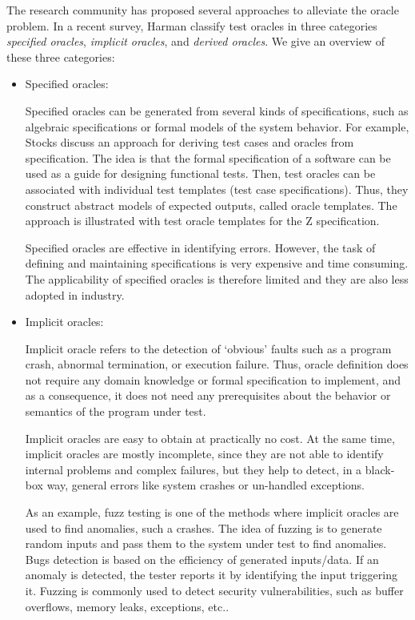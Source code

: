 The research community has proposed several approaches\cite{harman2013comprehensive,barr2015oracle} to alleviate the oracle problem. 
In a recent survey, Harman \etal\cite{harman2013comprehensive} classify test oracles in three categories \textit{specified oracles}, \textit{implicit oracles}, and \textit{derived oracles}. We give an overview of these three categories:
\begin{itemize}
	\item Specified oracles:
	
	Specified oracles can be generated from several kinds of specifications, such as algebraic specifications or formal models of the system behavior. 
	For example, Stocks \etal\cite{stocks1996framework,richardson1992specification} discuss an approach for deriving test cases and oracles from specification. The idea is that the formal specification of a software can be used as a guide for designing functional tests. Then, test oracles can be associated with individual test templates (test case specifications). Thus, they construct abstract models of expected outputs, called oracle templates. 
	The approach is illustrated with test oracle templates for the Z specification.
	
	Specified oracles are effective in identifying errors. However, the task of defining and maintaining specifications is very expensive and time consuming. The applicability of specified oracles is therefore limited and they are also less adopted in industry.
	
	\item Implicit oracles:
	
	Implicit oracle refers to the detection of ‘obvious’ faults such as a program crash, abnormal termination, or execution failure.
	Thus, oracle definition does not require any domain knowledge or formal specification to implement, and as a consequence, it does not need any prerequisites about the behavior or semantics of the program under test.
	
	Implicit oracles\cite{harman2013comprehensive,barr2015oracle} are easy to obtain at practically no cost. At the same time, implicit oracles are mostly incomplete, since they are not able to identify internal problems and complex failures, but they help to detect, in a black-box way, general errors like system crashes or un-handled exceptions.
	
	As an example, fuzz testing\cite{miller1990empirical} is one of the methods where implicit oracles are used to find anomalies, such a crashes. The idea of fuzzing is to generate random inputs and pass them to the system under test to find anomalies.
	Bugs detection is based on the efficiency of generated inputs/data. If an anomaly is detected, the tester reports it by identifying the input triggering it. 
	Fuzzing is commonly used to detect security vulnerabilities, such as buffer overflows, memory leaks, exceptions, etc.\cite{bekrar2011finding}.
	

\end{itemize}
